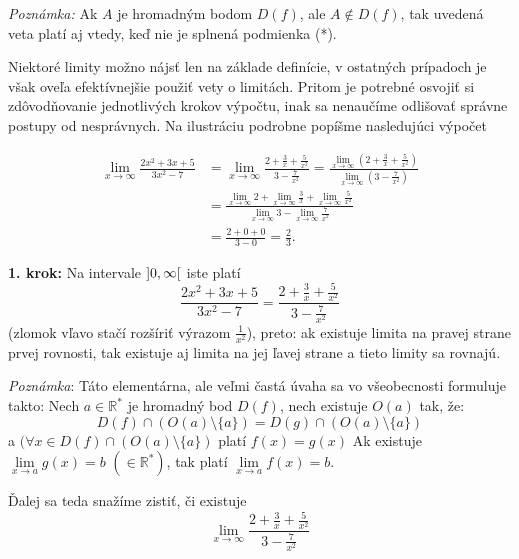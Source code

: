 \textit{Poznámka:}
Ak $A$ je hromadným bodom $D(f)$, ale $A \notin D(f)$, tak uvedená veta platí aj
vtedy, keď nie je splnená podmienka (*).

Niektoré limity možno nájsť len na základe definície, v ostatných prípadoch je
však oveľa efektívnejšie použiť vety o limitách. Pritom je potrebné osvojiť si
zdôvodňovanie jednotlivých krokov výpočtu, inak sa nenaučíme odlišovať správne
postupy od nesprávnych. Na ilustráciu podrobne popíšme nasledujúci výpočet

\[
  \begin{split}
    \lim_{x \rightarrow \infty} \frac{2x^2 + 3x + 5}{3x^2 - 7}
      &= \lim_{x \rightarrow \infty}
          \frac{
            2
            + \frac{3}{x}
            + \frac{5}{x^2}}{3 - \frac{7}{x^2}}
      = \frac{\lim\limits_{x \rightarrow \infty}
        (
          2
          + \frac{3}{x}
          + \frac{5}{x^2}
        )}{
          \lim\limits_{x \rightarrow \infty} (3 - \frac{7}{x^2})
        } \\
      &= \frac{
          \lim\limits_{x \rightarrow \infty}
          2
          + \lim\limits_{x \rightarrow \infty} \frac{3}{x}
          + \lim\limits_{x \rightarrow \infty} \frac{5}{x^2}
        }{
          \lim\limits_{x \rightarrow \infty} 3
          -
          \lim\limits_{x \rightarrow \infty}
            \frac{7}{x^2}
        } \\
      &= \frac{2+0+0}{3-0}
      = \frac{2}{3}.
  \end{split}
\]

\textbf{1. krok:}
Na intervale $\interval[open]{0}{\infty}$ iste platí
\[
  \frac{2x^2 + 3x + 5}{3x^2 - 7}
  = \frac{2 + \frac{3}{x} + \frac{5}{x^2}}{3 - \frac{7}{x^2}}
\]
(zlomok vľavo stačí rozšíriť výrazom $\frac{1}{x^2}$), preto: ak existuje limita
na pravej strane prvej rovnosti, tak existuje aj limita na jej ľavej strane a
tieto limity sa rovnajú.

\textit{Poznámka}: Táto elementárna, ale veľmi častá úvaha sa vo všeobecnosti
formuluje takto: Nech $a \in \mathbb{R^*}$ je hromadný bod $D(f)$, nech existuje
$O(a)$ tak, že:
\[
  D(f) \cap (O(a) \setminus \{ a\})=D(g) \cap (O(a) \setminus \{ a\})
\]
a $(\forall x \in D(f) \cap (O(a) \setminus \{ a\})$ platí $f(x)=g(x)$
Ak existuje $\lim\limits_{x \rightarrow a} g(x)=b$ $(\in \mathbb{R^*})$, tak
platí $\lim\limits_{x \rightarrow a} f(x)=b$.

Ďalej sa teda snažíme zistiť, či
existuje
\[
  \lim\limits_{x \rightarrow \infty}
    \frac{2+\frac{3}{x} + \frac{5}{x^2}}{3-\frac{7}{x^2}}
\]

